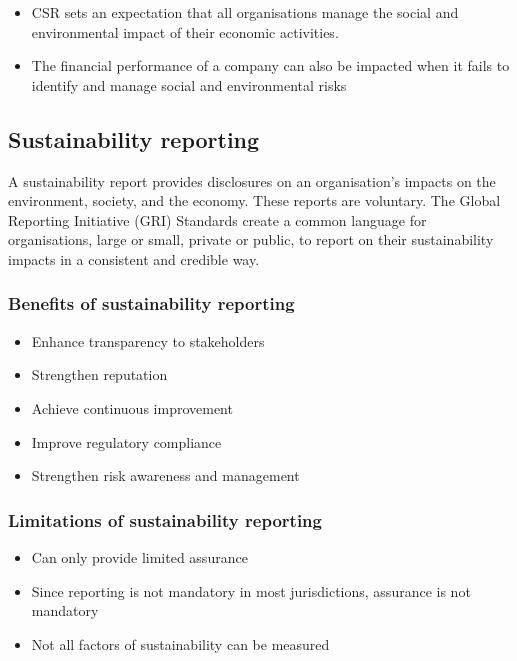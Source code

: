 \documentclass{article}
\begin{document}
		\begin{itemize}
			\item CSR sets an expectation that all organisations manage the social and environmental impact of their economic activities.
			\item The financial performance of a company can also be impacted when it fails to identify and manage social and environmental risks
		\end{itemize}

	\subsection{Sustainability reporting}

		A sustainability report provides disclosures on an organisation's impacts on the environment, society, and the economy. These reports are voluntary. The Global Reporting Initiative (GRI) Standards create a common language for organisations, large or small, private or public, to report on their sustainability impacts in a consistent and credible way.

		\subsubsection{Benefits of sustainability reporting}

			\begin{itemize}
				\item Enhance transparency to stakeholders
				\item Strengthen reputation
				\item Achieve continuous improvement
				\item Improve regulatory compliance
				\item Strengthen risk awareness and management
			\end{itemize}

		\subsubsection{Limitations of sustainability reporting}

			\begin{itemize}
				\item Can only provide limited assurance
				\item Since reporting is not mandatory in most jurisdictions, assurance is not mandatory
				\item Not all factors of sustainability can be measured
			\end{itemize}
\end{document}
